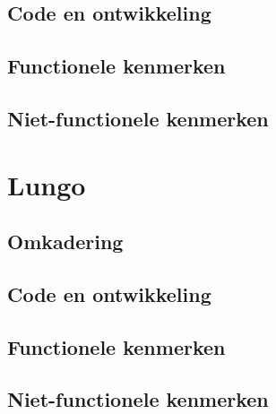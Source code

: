 \subsection{Code en ontwikkeling}
\subsection{Functionele kenmerken}
\subsection{Niet-functionele kenmerken}

\section{Lungo}

\subsection{Omkadering}
\subsection{Code en ontwikkeling}
\subsection{Functionele kenmerken}
\subsection{Niet-functionele kenmerken}
